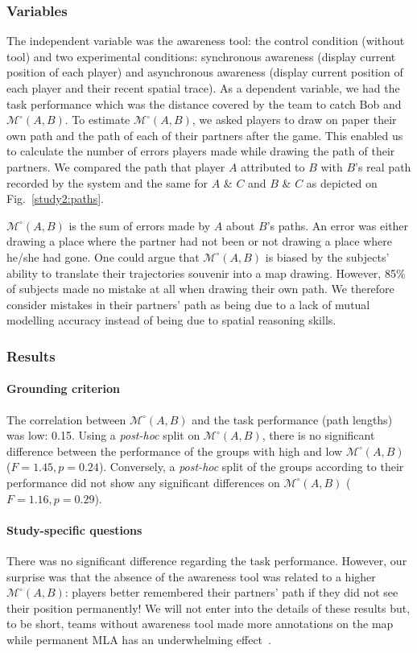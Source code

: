 \documentclass[twocolumn]{article}
\newcommand{\gModel}[2]{{$\mathcal{M}^{\circ}(#1, #2)$}}
\begin{document}
\subsubsection*{Variables}

The independent variable was the awareness tool: the control condition (without
tool) and two experimental conditions: synchronous awareness (display current
position of each player) and asynchronous awareness (display current position of
each player and their recent spatial trace).  As a dependent variable, we had
the task performance which was the distance covered by the team to catch Bob and
\gModel{A}{B}. To estimate \gModel{A}{B}, we asked players to draw on paper
their own path and the path of each of their partners after the game. This
enabled us to calculate the number of errors players made while drawing the path
of their partners. We compared the path that player $A$ attributed to $B$ with $B$'s
real path recorded by the system and the same for $A$ \& $C$ and $B$ \& $C$ as depicted
on Fig.~\ref{study2:paths}. 

\gModel{A}{B} is the sum of errors made by $A$ about $B$'s paths. An error was
either drawing a place where the partner had not been or not drawing a place
where he/she had gone. One could argue that \gModel{A}{B} is biased by the
subjects' ability to translate their trajectories souvenir into a map drawing.
However, 85\% of subjects made no mistake at all when drawing their own path. We
therefore consider mistakes in their partners' path as being due to a lack of
mutual modelling accuracy instead of being due to spatial reasoning skills.

\subsubsection*{Results}

\paragraph{Grounding criterion} The correlation between \gModel{A}{B} and the
task performance (path lengths) was low: 0.15. Using a \emph{post-hoc} split on
\gModel{A}{B}, there is no significant difference between the performance of the
groups with high and low \gModel{A}{B}  ($F = 1.45, p = 0.24$). Conversely, a
\emph{post-hoc} split of the groups according to their performance did not show
any significant differences on \gModel{A}{B} ($F = 1.16, p = 0.29$).

\paragraph{Study-specific questions} There was no significant difference
regarding the task performance. However, our surprise was that the absence of
the awareness tool was related to a higher \gModel{A}{B}: players better
remembered their partners' path if they did not see their position permanently!
We will not enter into the details of these results but, to be short, teams
without awareness tool made more annotations on the map while permanent MLA has
an underwhelming effect~\citep{nova2005location}.
\end{document}
